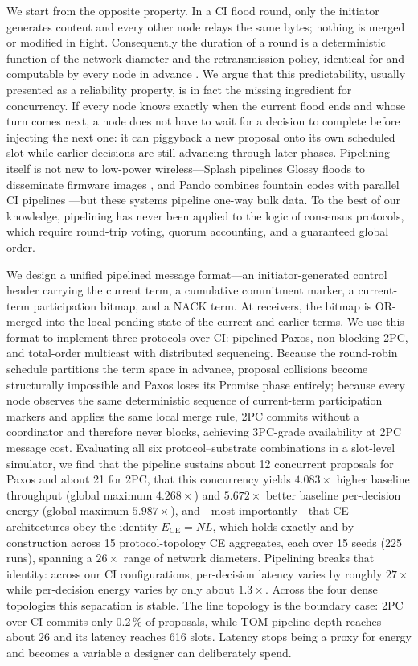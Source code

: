 \documentclass[journal]{IEEEtran}
\newcommand{\CI}{CI}                      %
\newcommand{\CE}{CE}                      %
\newcommand{\Nnodes}{N}                   %
\newcommand{\Ece}{E_{\mathrm{CE}}}        %
\begin{document}
We start from the opposite property. In a \CI{} flood round, only the
initiator generates content and every other node relays the same bytes;
nothing is merged or modified in flight. Consequently the duration of a
round is a deterministic function of the network diameter and the
retransmission policy, identical for and computable by every node in
advance \cite{alnahas19blueflood}. We argue that this predictability,
usually presented as a reliability property, is in fact the missing
ingredient for concurrency. If every node knows exactly when the current
flood ends and whose turn comes next, a node does not have to wait for a
decision to complete before injecting the next one: it can piggyback a new
proposal onto its own scheduled slot while earlier decisions are still
advancing through later phases. Pipelining itself is not new to low-power
wireless---Splash pipelines Glossy floods to disseminate firmware images
\cite{doddavenkatappa13splash}, and Pando combines fountain codes with
parallel \CI{} pipelines \cite{du17pando}---but these systems pipeline
one-way bulk data. To the best of our knowledge, pipelining has never been
applied to the logic of consensus protocols, which require round-trip
voting, quorum accounting, and a guaranteed global order.

We design a unified pipelined message format---an initiator-generated
control header carrying the current term, a cumulative commitment marker,
a current-term participation bitmap, and a NACK term. At receivers, the
bitmap is OR-merged into the local pending state of the current and
earlier terms. We use this format to implement three protocols over \CI: pipelined Paxos, non-blocking 2PC, and
total-order multicast with distributed sequencing. Because the round-robin
schedule partitions the term space in advance, proposal collisions become
structurally impossible and Paxos loses its Promise phase entirely; because
every node observes the same deterministic sequence of
current-term participation markers and applies the same local merge rule,
2PC commits without a coordinator and therefore never blocks,
achieving 3PC-grade availability \cite{skeen81nonblocking} at 2PC message
cost. Evaluating all six protocol--substrate combinations in a slot-level
simulator, we find that the pipeline sustains about 12 concurrent proposals
for Paxos and about 21 for 2PC, that this concurrency yields $4.083\times$
higher baseline throughput (global maximum $4.268\times$) and $5.672\times$ better baseline
per-decision energy (global maximum $5.987\times$), and---most importantly---that \CE{} architectures obey
the identity $\Ece = \Nnodes L$, which holds exactly and by construction
across 15 protocol-topology CE aggregates, each over 15 seeds (225 runs), spanning a $26\times$ range of network
diameters. Pipelining breaks that identity: across our \CI{} configurations,
per-decision latency varies by roughly $27\times$ while per-decision energy
varies by only about $1.3\times$. Across the four dense topologies this
separation is stable. The line topology is the boundary case: 2PC over \CI{}
commits only 0.2\,\% of proposals, while TOM pipeline depth reaches about 26
and its latency reaches 616 slots. Latency stops being a proxy for energy
and becomes a variable a designer can deliberately spend.
\end{document}

